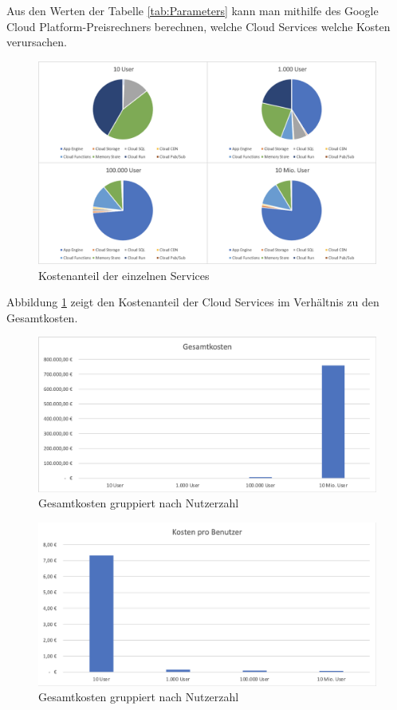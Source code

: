 \documentclass{article}
\begin{document}
Aus den Werten der Tabelle \ref{tab:Parameters} kann man mithilfe des Google Cloud Platform-Preisrechners berechnen, welche Cloud Services welche Kosten verursachen.~\cite{google-pricing}

\begin{figure}[htbp]
\centering
\label{fig:pricingUsers}
\includegraphics[width=\textwidth]{images/pricing-users}
\caption{Kostenanteil der einzelnen Services}
\end{figure}

Abbildung \ref{fig:pricingUsers} zeigt den Kostenanteil der Cloud Services im Verhältnis zu den Gesamtkosten.

\begin{figure}[htbp]
\centering
\label{fig:totalCost}
\includegraphics[width=\textwidth]{images/total-cost}
\caption{Gesamtkosten gruppiert nach Nutzerzahl}
\end{figure}

\begin{figure}[htbp]
\centering
\label{fig:costPerUser}
\includegraphics[width=\textwidth]{images/cost-per-user}
\caption{Gesamtkosten gruppiert nach Nutzerzahl}
\end{figure}





\appendix



{}

\end{document}
